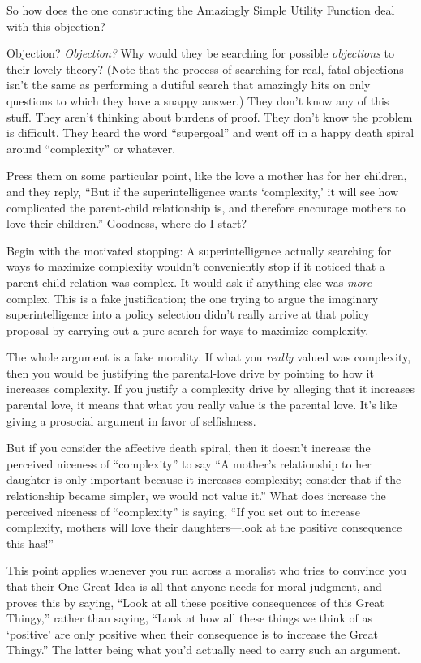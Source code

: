 {
 So how does the one constructing the Amazingly Simple Utility
Function deal with this objection?}

{
 Objection? \textit{Objection?} Why would they be searching for
possible \textit{objections} to their lovely theory? (Note that the
process of searching for real, fatal objections isn't
the same as performing a dutiful search that amazingly hits on only
questions to which they have a snappy answer.) They
don't know any of this stuff. They
aren't thinking about burdens of proof. They
don't know the problem is difficult. They heard the
word ``supergoal'' and went off in a
happy death spiral around
``complexity'' or whatever.}

{
 Press them on some particular point, like the love a mother has
for her children, and they reply, ``But if the
superintelligence wants `complexity,' it
will see how complicated the parent-child relationship is, and
therefore encourage mothers to love their children.''
Goodness, where do I start?}

{
 Begin with the motivated stopping: A superintelligence actually
searching for ways to maximize complexity wouldn't
conveniently stop if it noticed that a parent-child relation was
complex. It would ask if anything else was \textit{more} complex. This
is a fake justification; the one trying to argue the imaginary
superintelligence into a policy selection didn't really
arrive at that policy proposal by carrying out a pure search for ways
to maximize complexity.}

{
 The whole argument is a fake morality. If what you \textit{really}
valued was complexity, then you would be justifying the parental-love
drive by pointing to how it increases complexity. If you justify a
complexity drive by alleging that it increases parental love, it means
that what you really value is the parental love. It's
like giving a prosocial argument in favor of selfishness.}

{
 But if you consider the affective death spiral, then it
doesn't increase the perceived niceness of
``complexity'' to say
``A mother's relationship to her
daughter is only important because it increases complexity; consider
that if the relationship became simpler, we would not value
it.'' What does increase the perceived niceness of
``complexity'' is saying,
``If you set out to increase complexity, mothers will
love their daughters---look at the positive consequence this
has!''}

{
 This point applies whenever you run across a moralist who tries to
convince you that their One Great Idea is all that anyone needs for
moral judgment, and proves this by saying, ``Look at
all these positive consequences of this Great
Thingy,'' rather than saying, ``Look
at how all these things we think of as
`positive' are only positive when their
consequence is to increase the Great Thingy.'' The
latter being what you'd actually need to carry such an
argument.}

